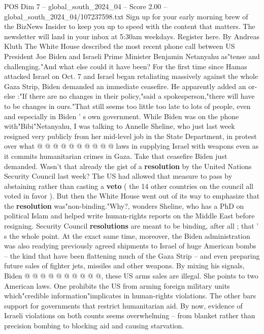 \begin{textsample}{POS Dim 7 – global\_south\_2024\_04 – Score 2.00 – global\_south\_2024\_04/107237598.txt}  \label{ex:f7_pos_107}
Sign up for your early morning brew of the BizNews Insider to keep you up to speed with the content that matters.
The newsletter will land in your inbox at 5:30am weekdays.
Register here.
By Andreas Kluth The White House described the most recent phone call between US President Joe Biden and Israeli Prime Minister Benjamin Netanyahu as"tense and challenging."And what else could it have been?
For the first time since Hamas attacked Israel on Oct. 7 and Israel began retaliating massively against the whole Gaza Strip, Biden demanded an immediate ceasefire.
He apparently added an or-else :"If there are no changes in their policy,"said a spokesperson,"there will have to be changes in ours."That still seems too little too late to lots of people, even and especially in Biden ' s own government.
While Biden was on the phone with"Bibi"Netanyahu, I was talking to Annelle Sheline, who just last week resigned very publicly from her mid-level job in the State Department, in protest over what @ @ @ @ @ @ @ @ @ @ laws in supplying Israel with weapons even as it commits humanitarian crimes in Gaza.
Take that ceasefire Biden just demanded.
Wasn't that already the gist of a \textbf{resolution} by the United Nations Security Council last week?
The US had allowed that measure to pass by abstaining rather than casting a \textbf{veto} ( the 14 other countries on the council all voted in favor ).
But then the White House went out of its way to emphasize that the \textbf{resolution} was"non-binding."Why?, wonders Sheline, who has a PhD on political Islam and helped write human-rights reports on the Middle East before resigning.
Security Council \textbf{resolutions} are meant to be binding, after all ; that ' s the whole point.
At the exact same time, moreover, the Biden administration was also readying previously agreed shipments to Israel of huge American bombs -- the kind that have been flattening much of the Gaza Strip -- and even preparing future sales of fighter jets, missiles and other weapons.
By mixing his signals, Biden @ @ @ @ @ @ @ @ @ @, these US arms sales are illegal.
She points to two American laws.
One prohibits the US from arming foreign military units which"credible information"implicates in human-rights violations.
The other bars support for governments that restrict humanitarian aid.
By now, evidence of Israeli violations on both counts seems overwhelming -- from blanket rather than precision bombing to blocking aid and causing starvation.

\end{textsample}
